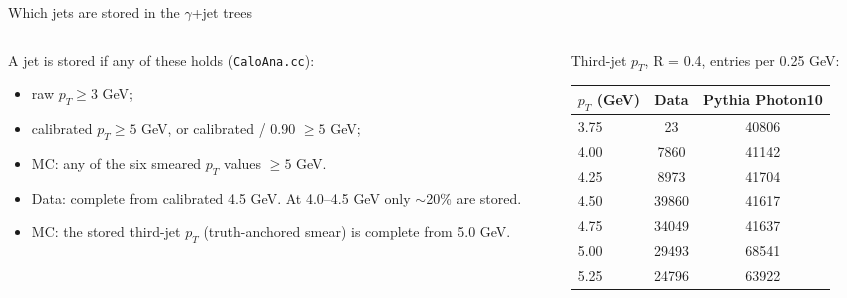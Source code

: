 \documentclass[aspectratio=169,10pt]{beamer}
\begin{document}
\begin{frame}{Which jets are stored in the $\gamma$+jet trees}
  \begin{columns}[T]
    \begin{column}{0.5\textwidth}
      \small
      A jet is stored if any of these holds (\texttt{CaloAna.cc}):
      \begin{itemize}
        \item raw $p_T \geq 3$ GeV;
        \item calibrated $p_T \geq 5$ GeV, or calibrated / 0.90 $\geq 5$ GeV;
        \item MC: any of the six smeared $p_T$ values $\geq 5$ GeV.
      \end{itemize}
      \vspace{0.5em}
      \begin{itemize}
        \item Data: complete from calibrated 4.5 GeV. At 4.0--4.5 GeV only $\sim$20\% are stored.
        \item MC: the stored third-jet $p_T$ (truth-anchored smear) is complete from 5.0 GeV.
      \end{itemize}
    \end{column}
    \begin{column}{0.48\textwidth}
      \small
      Third-jet $p_T$, R = 0.4, entries per 0.25 GeV:
      \vspace{0.3em}

      \centering
      \begin{tabular}{lcc}
        \toprule
        $p_T$ (GeV) & Data & Pythia Photon10 \\
        \midrule
        3.75 & 23 & 40806 \\
        4.00 & 7860 & 41142 \\
        4.25 & 8973 & 41704 \\
        4.50 & 39860 & 41617 \\
        4.75 & 34049 & 41637 \\
        5.00 & 29493 & 68541 \\
        5.25 & 24796 & 63922 \\
        \bottomrule
      \end{tabular}
    \end{column}
  \end{columns}
\end{frame}
\end{document}
